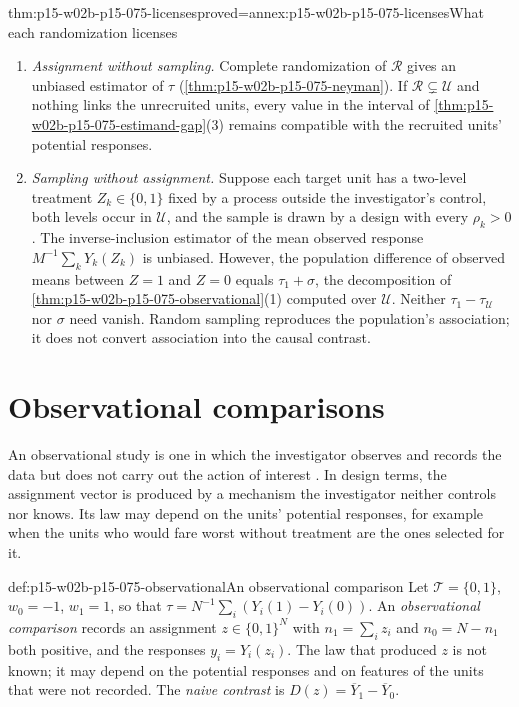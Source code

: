 \begin{hbcorollary}{thm:p15-w02b-p15-075-licenses}{proved=annex:p15-w02b-p15-075-licenses}{What each randomization licenses}
\begin{enumerate}
\item \emph{Assignment without sampling.} Complete randomization of
\(\mathcal R\) gives an unbiased estimator of \(\tau\)
(\cref{thm:p15-w02b-p15-075-neyman}). If \(\mathcal R\subsetneq\mathcal U\)
and nothing links the unrecruited units, every value in the interval of
\cref{thm:p15-w02b-p15-075-estimand-gap}(3) remains compatible with the
recruited units' potential responses.
\item \emph{Sampling without assignment.} Suppose each target unit has a
two-level treatment \(Z_k\in\{0,1\}\) fixed by a process outside the
investigator's control, both levels occur in \(\mathcal U\), and the sample is
drawn by a design with every \(\rho_k>0\). The inverse-inclusion estimator of
the mean observed response \(M^{-1}\sum_kY_k(Z_k)\) is unbiased. However, the
population difference of observed means between \(Z=1\) and \(Z=0\) equals
\(\tau_1+\sigma\), the decomposition of
\cref{thm:p15-w02b-p15-075-observational}(1) computed over \(\mathcal U\).
Neither \(\tau_1-\tau_{\mathcal U}\) nor \(\sigma\) need vanish. Random sampling reproduces the population's
association; it does not convert association into the causal contrast.
\end{enumerate}
\end{hbcorollary}

\section{Observational comparisons}
\label{sec:p15-w02b-p15-075-observational}

An observational study is one in which the investigator observes and records
the data but does not carry out the action of interest
\cite[ch.~3, p.~27]{HernanRobins2020WhatIf2026}. In design terms, the
assignment vector is produced by a mechanism the investigator neither controls
nor knows. Its law may depend on the units' potential responses, for example
when the units who would fare worst without treatment are the ones selected for
it.

\begin{hbdefinition}{def:p15-w02b-p15-075-observational}{An observational comparison}
Let \(\mathcal T=\{0,1\}\), \(w_0=-1\), \(w_1=1\), so that
\(\tau=N^{-1}\sum_i(Y_i(1)-Y_i(0))\). An \emph{observational comparison} records
an assignment \(z\in\{0,1\}^N\) with \(n_1=\sum_iz_i\) and \(n_0=N-n_1\) both
positive, and the responses \(y_i=Y_i(z_i)\). The law that produced \(z\) is
not known; it may depend on the potential responses and on features of the
units that were not recorded. The \emph{naive contrast} is
\(D(z)=\overline Y_1-\overline Y_0\).
\end{hbdefinition}

